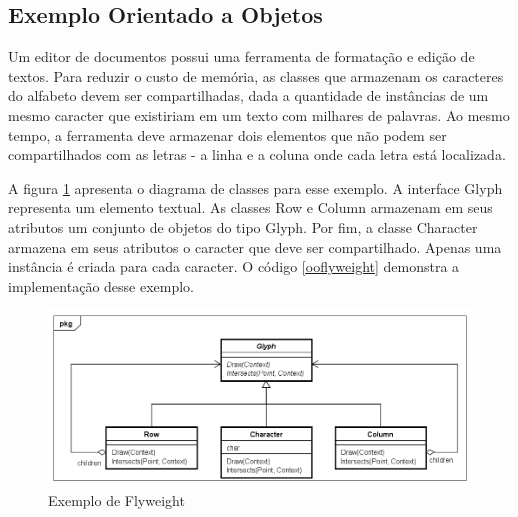 \subsection*{Exemplo Orientado a Objetos}

Um editor de documentos possui uma ferramenta 
de formatação e edição de textos. Para reduzir o 
custo de memória, as classes que armazenam os 
caracteres do alfabeto devem ser compartilhadas, 
dada a quantidade de instâncias de um mesmo caracter 
que existiriam em um texto com milhares de palavras. 
Ao mesmo tempo, a ferramenta deve armazenar dois 
elementos que não podem ser compartilhados com as 
letras - a linha e a coluna onde cada letra está 
localizada. 

A figura \ref{flyweight_exemplo} apresenta o diagrama 
de classes para esse exemplo. A interface Glyph 
representa um elemento textual. As classes Row e 
Column armazenam em seus atributos um conjunto de objetos 
do tipo Glyph. 
Por fim, a classe Character armazena em seus atributos 
o caracter que deve ser compartilhado. Apenas uma 
instância é criada para cada caracter. O 
código \ref{ooflyweight} demonstra a implementação 
desse exemplo.

\begin{figure}[htb]
	\caption{\label{flyweight_exemplo}Exemplo de Flyweight}
	\begin{center}
	    \includegraphics[scale=0.5]{5_padroes-contexto-funcional/5.2_estruturais/5.2.6_flyweight/flyweight_exemplo.png}
	\end{center}
\end{figure}

